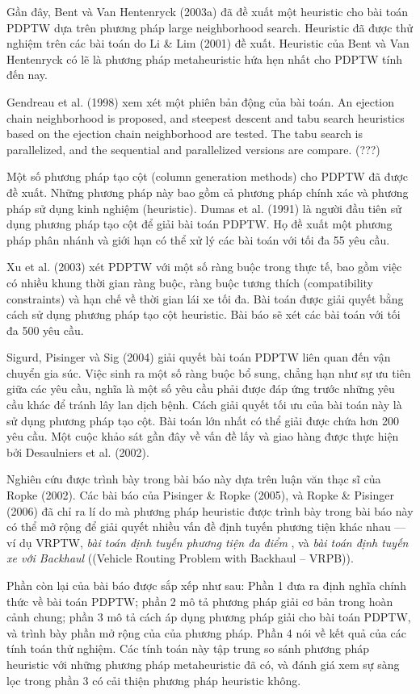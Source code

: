 Gần đây, Bent và Van Hentenryck (2003a) đã đề xuất một heuristic cho bài toán PDPTW dựa trên phương pháp large neighborhood search. Heuristic đã được thử nghiệm trên các bài toán do Li \& Lim (2001) đề xuất. Heuristic của Bent và Van Hentenryck có lẽ là phương pháp metaheuristic hứa hẹn nhất cho PDPTW tính đến nay.

Gendreau et al. (1998) xem xét một phiên bản động của bài toán. An ejection chain neighborhood is proposed, and steepest descent and tabu search heuristics based on the ejection chain neighborhood are tested. The tabu search is parallelized, and the sequential and parallelized versions are compare. (???)

Một số phương pháp tạo cột (column generation methods) cho PDPTW đã được đề xuất. Những phương pháp này bao gồm cả phương pháp chính xác và phương pháp sử dụng kinh nghiệm (heuristic). Dumas et al. (1991) là người đầu tiên sử dụng phương pháp tạo cột để giải bài toán PDPTW. Họ đề xuất một phương pháp phân nhánh và giới hạn có thể xử lý các bài toán với tối đa 55 yêu cầu.

Xu et al. (2003) xét PDPTW với một số ràng buộc trong thực tế, bao gồm việc có nhiều khung thời gian ràng buộc, ràng buộc tương thích (compatibility constraints) và hạn chế về thời gian lái xe tối đa. Bài toán được giải quyết bằng cách sử dụng phương pháp tạo cột heuristic. Bài báo sẽ xét các bài toán với tối đa 500 yêu cầu.

Sigurd, Pisinger và Sig (2004) giải quyết bài toán PDPTW liên quan đến vận chuyển gia súc. Việc sinh ra một số ràng buộc bổ sung, chẳng hạn như sự ưu tiên giữa các yêu cầu, nghĩa là một số yêu cầu phải được đáp ứng trước những yêu cầu khác để tránh lây lan dịch bệnh. Cách giải quyết tối ưu của bài toán này là sử dụng phương pháp tạo cột. Bài toán lớn nhất có thể giải được chứa hơn 200 yêu cầu. Một cuộc khảo sát gần đây về vấn đề lấy và giao hàng được thực hiện bởi Desaulniers et al. (2002).

Nghiên cứu được trình bày trong bài báo này dựa trên luận văn thạc sĩ của Ropke (2002). Các bài báo của Pisinger \& Ropke (2005), và Ropke \& Pisinger (2006) đã chỉ ra lí do mà phương pháp heuristic được trình bày trong bài báo này có thể mở rộng để giải quyết nhiều vấn đề định tuyến phương tiện khác nhau — ví dụ VRPTW, \textit{bài toán định tuyến phương tiện đa điểm} , và \textit{bài toán định tuyến xe với Backhaul} ((Vehicle Routing Problem with Backhaul – VRPB)).

Phần còn lại của bài báo được sắp xếp như sau: Phần 1 đưa ra định nghĩa chính thức về bài toán PDPTW; phần 2 mô tả phương pháp giải cơ bản trong hoàn cảnh chung; phần 3 mô tả cách áp dụng phương pháp giải cho bài toán PDPTW, và trình bày phần mở rộng của của phương pháp. Phần 4 nói về kết quả của các tính toán thử nghiệm. Các tính toán này tập trung so sánh phương pháp heuristic với những phương pháp metaheuristic đã có, và đánh giá xem sự sàng lọc trong phần 3 có cải thiện phương pháp heuristic không.
